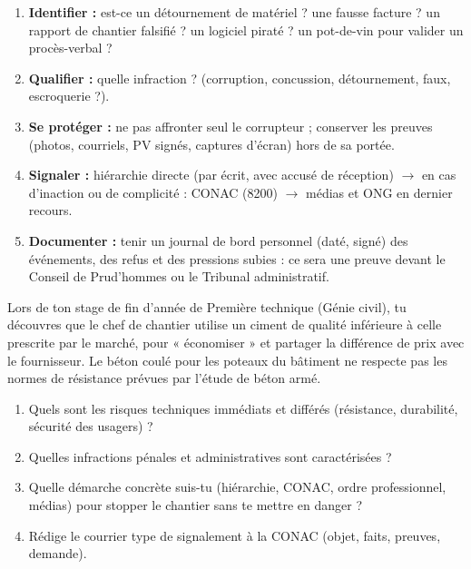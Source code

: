 \documentclass[11pt]{article}
\begin{document}
\begin{methode}
\begin{enumerate}
\item \textbf{Identifier :} est-ce un détournement de matériel ? une fausse facture ? un rapport de chantier falsifié ? un logiciel piraté ? un pot-de-vin pour valider un procès-verbal ?
\item \textbf{Qualifier :} quelle infraction ? (corruption, concussion, détournement, faux, escroquerie ?).
\item \textbf{Se protéger :} ne pas affronter seul le corrupteur ; conserver les preuves (photos, courriels, PV signés, captures d'écran) hors de sa portée.
\item \textbf{Signaler :} hiérarchie directe (par écrit, avec accusé de réception) $\rightarrow$ en cas d'inaction ou de complicité : CONAC (8200) $\rightarrow$ médias et ONG en dernier recours.
\item \textbf{Documenter :} tenir un journal de bord personnel (daté, signé) des événements, des refus et des pressions subies : ce sera une preuve devant le Conseil de Prud'hommes ou le Tribunal administratif.
\end{enumerate}
\end{methode}

\begin{exercice}
Lors de ton stage de fin d'année de Première technique (Génie civil), tu découvres que le chef de chantier utilise un ciment de qualité inférieure à celle prescrite par le marché, pour « économiser » et partager la différence de prix avec le fournisseur. Le béton coulé pour les poteaux du bâtiment ne respecte pas les normes de résistance prévues par l'étude de béton armé.
\begin{enumerate}
\item Quels sont les risques techniques immédiats et différés (résistance, durabilité, sécurité des usagers) ?
\item Quelles infractions pénales et administratives sont caractérisées ?
\item Quelle démarche concrète suis-tu (hiérarchie, CONAC, ordre professionnel, médias) pour stopper le chantier sans te mettre en danger ?
\item Rédige le courrier type de signalement à la CONAC (objet, faits, preuves, demande).
\end{enumerate}
\end{exercice}
\end{document}

